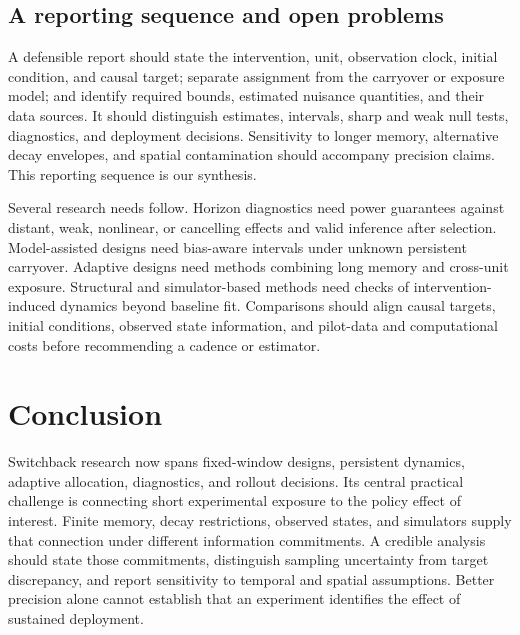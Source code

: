\documentclass[12pt]{article}
\begin{document}
\subsection{A reporting sequence and open problems}

A defensible report should state the intervention, unit, observation clock, initial condition, and causal target; separate assignment from the carryover or exposure model; and identify required bounds, estimated nuisance quantities, and their data sources. It should distinguish estimates, intervals, sharp and weak null tests, diagnostics, and deployment decisions. Sensitivity to longer memory, alternative decay envelopes, and spatial contamination should accompany precision claims. This reporting sequence is our synthesis.

Several research needs follow. Horizon diagnostics need power guarantees against distant, weak, nonlinear, or cancelling effects and valid inference after selection. Model-assisted designs need bias-aware intervals under unknown persistent carryover. Adaptive designs need methods combining long memory and cross-unit exposure. Structural and simulator-based methods need checks of intervention-induced dynamics beyond baseline fit. Comparisons should align causal targets, initial conditions, observed state information, and pilot-data and computational costs before recommending a cadence or estimator.

\section{Conclusion}

Switchback research now spans fixed-window designs, persistent dynamics, adaptive allocation, diagnostics, and rollout decisions. Its central practical challenge is connecting short experimental exposure to the policy effect of interest. Finite memory, decay restrictions, observed states, and simulators supply that connection under different information commitments. A credible analysis should state those commitments, distinguish sampling uncertainty from target discrepancy, and report sensitivity to temporal and spatial assumptions. Better precision alone cannot establish that an experiment identifies the effect of sustained deployment.

\clearpage
\begin{singlespace}
\small

\end{singlespace}
\end{document}
